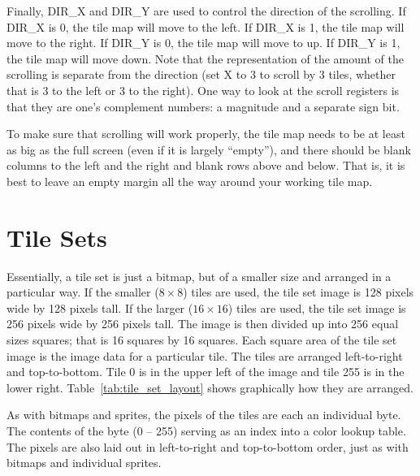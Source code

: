 Finally, DIR\_X and DIR\_Y are used to control the direction of the scrolling. If DIR\_X is 0, the tile map will move to the left. If DIR\_X is 1, the tile map will move to the right. If DIR\_Y is 0, the tile map will move to up. If DIR\_Y is 1, the tile map will move down. Note that the representation of the amount of the scrolling is separate from the direction (set X to 3 to scroll by 3 tiles, whether that is 3 to the left or 3 to the right). One way to look at the scroll registers is that they are one's complement numbers: a magnitude and a separate sign bit.

To make sure that scrolling will work properly, the tile map needs to be at least as big as the full screen (even if it is largely ``empty''), and there should be blank columns to the left and the right and blank rows above and below. That is, it is best to leave an empty margin all the way around your working tile map.

\section{Tile Sets}

Essentially, a tile set is just a bitmap, but of a smaller size and arranged in a particular way. If the smaller ($8 \times 8$) tiles are used, the tile set image is 128 pixels wide by 128 pixels tall. If the larger ($16 \times 16$) tiles are used, the tile set image is 256 pixels wide by 256 pixels tall. The image is then divided up into 256 equal sizes squares; that is 16 squares by 16 squares. Each square area of the tile set image is the image data for a particular tile. The tiles are arranged left-to-right and top-to-bottom. Tile 0 is in the upper left of the image and tile 255 is in the lower right. Table~\ref{tab:tile_set_layout} shows graphically how they are arranged.

As with bitmaps and sprites, the pixels of the tiles are each an individual byte. The contents of the byte (0 -- 255) serving as an index into a color lookup table. The pixels are also laid out in left-to-right and top-to-bottom order, just as with bitmaps and individual sprites.


